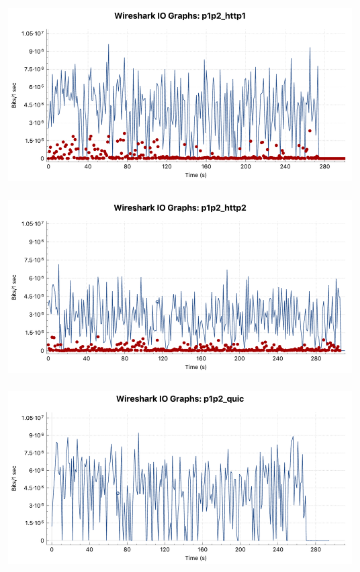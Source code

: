 \begin{figure}[htb!]
\centering
\begin{subfigure}[t]{0.35\textwidth}
   \captionsetup{justification=centering,margin=0cm}
     \hspace{-55pt}
    \includegraphics[scale=0.33, trim={100 0 0 0}]{figures/p1p2_http1.pdf}
     \caption{}
    \label{fig:sdn_p1_p2http1}
  \end{subfigure}
  \begin{subfigure}[t]{0.35\textwidth}
  \captionsetup{justification=raggedright,singlelinecheck=false,margin=2.5cm}
    \includegraphics[scale=0.33, trim={25 0 0 0}]{figures/p1p2_http2.pdf}
    \caption{}
    \label{fig:sdn_p1_p2http2}
  \end{subfigure}
    \begin{subfigure}[t]{0.35\textwidth}
  \captionsetup{justification=centering,margin=1.5cm}
    \includegraphics[scale=0.33,trim={150 0 0 0}]{figures/p1p2_quic.pdf}

\end{subfigure}
\end{figure}
